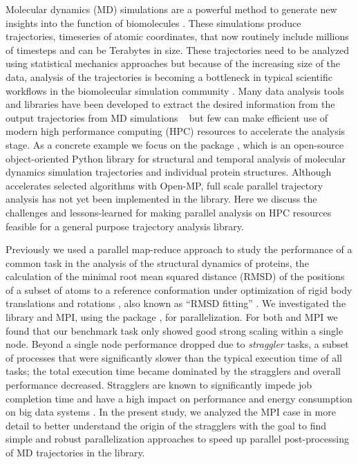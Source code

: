 \label{sec:introduction}
Molecular dynamics (MD) simulations are a powerful method to generate new insights into the function of biomolecules \citep{Borhani:2012mi, Dror:2012cr, Orozco:2014dq, Perilla:2015kx, Bottaro:2018aa}.
These simulations produce trajectories, timeseries of atomic coordinates, that now routinely include millions of timesteps and can be Terabytes in size.
These trajectories need to be analyzed using statistical mechanics approaches \cite{Mura:2014kx} but because of the increasing size of the data, analysis of the trajectories is becoming a bottleneck in typical scientific workflows in the biomolecular simulation community \cite{Cheatham:2015}.
Many data analysis tools and libraries have been developed to extract the desired information from the output trajectories from MD simulations ~\cite{nmoldyn, nmoldyn-2012, Hum96, Hinsen:2000kx, Grant:2006ud, himach-2008, Romo:2009zr, Romo:2014bh, Michaud-Agrawal:2011fu, Gowers:2016aa, cpptraj-2013, mdtraj-2015, pteros2015, Doerr:2016aa} but few can make efficient use of modern high performance computing (HPC) resources to accelerate the analysis stage.
As a concrete example we focus on the  package \citep{Gowers:2016aa,Michaud-Agrawal:2011fu}, which is an open-source object-oriented Python library for structural and temporal analysis of molecular dynamics simulation trajectories and individual protein structures.
Although  accelerates selected algorithms with Open-MP, full scale parallel trajectory analysis has not yet been implemented in the library.
Here we discuss the challenges and lessons-learned for making parallel analysis on HPC resources feasible for a general purpose trajectory analysis library.

Previously we used a parallel map-reduce approach to study the performance of a common task in the analysis of the structural dynamics of proteins, the calculation of the minimal root mean squared distance (RMSD) of the positions of a subset of atoms to a reference conformation under optimization of rigid body translations and rotations \cite{Khoshlessan:2017ab, ICCP-2018}, also known as ``RMSD fitting'' \cite{Liu:2010kx, Mura:2014kx}. 
We investigated the  library \cite{Rocklin:2015aa} and MPI, using the  package \cite{Dalcin:2011aa, Dalcin:2005aa}, for parallelization. 
For both  and MPI we found that our benchmark task only showed good strong scaling within a single node.
Beyond a single node performance dropped due to \emph{straggler} tasks, a subset of processes that were significantly slower than the typical execution time of all tasks; the total execution time became dominated by the stragglers and overall performance decreased.
Stragglers are known to significantly impede job completion time \cite{Garraghan2016} and have a high impact on performance and energy consumption on big data systems \cite{Tien-2017}.
In the present study, we analyzed the MPI case in more detail to better understand the origin of the stragglers with the goal to find simple and robust parallelization approaches to speed up parallel post-processing of MD trajectories in the  library. 

